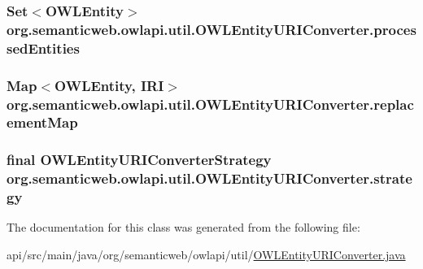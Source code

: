 \hypertarget{classorg_1_1semanticweb_1_1owlapi_1_1util_1_1_o_w_l_entity_u_r_i_converter_a316ffd77f6f0de5b58adf2e070aa8546}{
\subsubsection[{processed\-Entities}]{\setlength{\rightskip}{0pt plus 5cm}Set$<${\bf O\-W\-L\-Entity}$>$ org.\-semanticweb.\-owlapi.\-util.\-O\-W\-L\-Entity\-U\-R\-I\-Converter.\-processed\-Entities\hspace{0.3cm}{\ttfamily [private]}}}\label{classorg_1_1semanticweb_1_1owlapi_1_1util_1_1_o_w_l_entity_u_r_i_converter_a316ffd77f6f0de5b58adf2e070aa8546}
\hypertarget{classorg_1_1semanticweb_1_1owlapi_1_1util_1_1_o_w_l_entity_u_r_i_converter_a916b85c5e619e6ef45c6303959749681}{
\subsubsection[{replacement\-Map}]{\setlength{\rightskip}{0pt plus 5cm}Map$<${\bf O\-W\-L\-Entity}, {\bf I\-R\-I}$>$ org.\-semanticweb.\-owlapi.\-util.\-O\-W\-L\-Entity\-U\-R\-I\-Converter.\-replacement\-Map\hspace{0.3cm}{\ttfamily [private]}}}\label{classorg_1_1semanticweb_1_1owlapi_1_1util_1_1_o_w_l_entity_u_r_i_converter_a916b85c5e619e6ef45c6303959749681}
\hypertarget{classorg_1_1semanticweb_1_1owlapi_1_1util_1_1_o_w_l_entity_u_r_i_converter_a1d9858051f6393dcac39a57d1e91e685}{
\subsubsection[{strategy}]{\setlength{\rightskip}{0pt plus 5cm}final {\bf O\-W\-L\-Entity\-U\-R\-I\-Converter\-Strategy} org.\-semanticweb.\-owlapi.\-util.\-O\-W\-L\-Entity\-U\-R\-I\-Converter.\-strategy\hspace{0.3cm}{\ttfamily [private]}}}\label{classorg_1_1semanticweb_1_1owlapi_1_1util_1_1_o_w_l_entity_u_r_i_converter_a1d9858051f6393dcac39a57d1e91e685}


The documentation for this class was generated from the following file\-:\begin{DoxyCompactItemize}
\item 
api/src/main/java/org/semanticweb/owlapi/util/\hyperlink{_o_w_l_entity_u_r_i_converter_8java}{O\-W\-L\-Entity\-U\-R\-I\-Converter.\-java}\end{DoxyCompactItemize}
